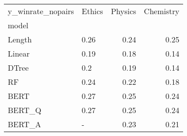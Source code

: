 \begin{tabular}{llrr}
\toprule
y\_winrate\_nopairs & Ethics &  Physics &  Chemistry \\
model  &        &          &            \\
\midrule
Length &   0.26 &     0.24 &       0.25 \\
Linear &   0.19 &     0.18 &       0.14 \\
DTree  &    0.2 &     0.19 &       0.14 \\
RF     &   0.24 &     0.22 &       0.18 \\
BERT   &   0.27 &     0.25 &       0.24 \\
BERT\_Q &   0.27 &     0.25 &       0.24 \\
BERT\_A &      - &     0.23 &       0.21 \\
\bottomrule
\end{tabular}
